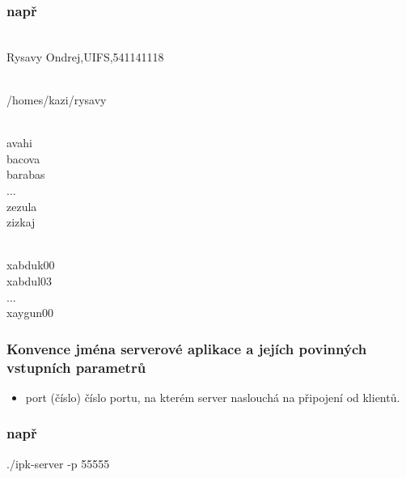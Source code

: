 \documentclass[11pt, a4paper, titlepage]{article}
\begin{document}
\subsubsection*{např}

\begin{framed}
	 \\
	Rysavy Ondrej,UIFS,541141118
\end{framed}

\begin{framed}
	 \\
	/homes/kazi/rysavy
\end{framed}

\begin{framed}
	 \\
	avahi \\
	bacova \\
	barabas \\
	... \\
	zezula \\
	zizkaj
\end{framed}

\begin{framed}
	 \\
	xabduk00 \\
	xabdul03 \\
	... \\
	xaygun00
\end{framed}


\subsubsection*{\textbf{Konvence jména serverové aplikace a jejích povinných vstupních parametrů}}


\begin{itemize}
	\item port (číslo) číslo portu, na kterém server naslouchá na připojení od klientů.
\end{itemize}

\subsubsection*{např}

\begin{framed}
	./ipk-server -p 55555
\end{framed}
\end{document}
